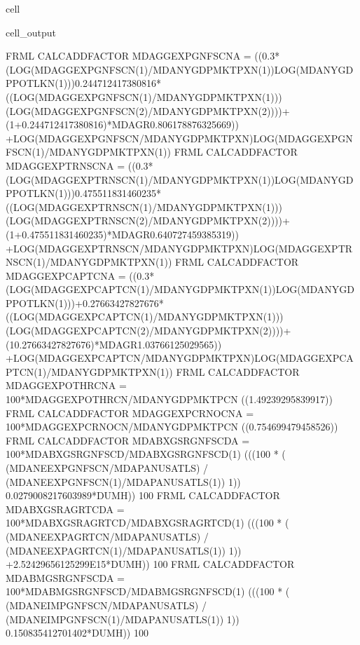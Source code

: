 \documentclass[letterpaper,10pt,english]{jupyterBook}
\begin{document}
\begin{sphinxuseclass}{cell}
\begin{sphinxVerbatimOutput}
\begin{sphinxuseclass}{cell_output}
\begin{sphinxVerbatim}[commandchars=\\\{\}]
FRML \PYGZlt{}CALC\PYGZus{}ADD\PYGZus{}FACTOR\PYGZgt{} MDAGGEXPGNFSCN\PYGZus{}A = \PYGZhy{} ((\PYGZhy{}0.3*(LOG(MDAGGEXPGNFSCN(\PYGZhy{}1)/MDANYGDPMKTPXN(\PYGZhy{}1))\PYGZhy{}LOG(MDANYGDPPOTLKN(\PYGZhy{}1)))\PYGZhy{}0.244712417380816*((LOG(MDAGGEXPGNFSCN(\PYGZhy{}1)/MDANYGDPMKTPXN(\PYGZhy{}1)))\PYGZhy{}(LOG(MDAGGEXPGNFSCN(\PYGZhy{}2)/MDANYGDPMKTPXN(\PYGZhy{}2))))+(1+0.244712417380816)*MDAGR\PYGZhy{}0.806178876325669)) +LOG(MDAGGEXPGNFSCN/MDANYGDPMKTPXN)\PYGZhy{}LOG(MDAGGEXPGNFSCN(\PYGZhy{}1)/MDANYGDPMKTPXN(\PYGZhy{}1))\PYGZdl{}
FRML \PYGZlt{}CALC\PYGZus{}ADD\PYGZus{}FACTOR\PYGZgt{} MDAGGEXPTRNSCN\PYGZus{}A = \PYGZhy{} ((\PYGZhy{}0.3*(LOG(MDAGGEXPTRNSCN(\PYGZhy{}1)/MDANYGDPMKTPXN(\PYGZhy{}1))\PYGZhy{}LOG(MDANYGDPPOTLKN(\PYGZhy{}1)))\PYGZhy{}0.475511831460235*((LOG(MDAGGEXPTRNSCN(\PYGZhy{}1)/MDANYGDPMKTPXN(\PYGZhy{}1)))\PYGZhy{}(LOG(MDAGGEXPTRNSCN(\PYGZhy{}2)/MDANYGDPMKTPXN(\PYGZhy{}2))))+(1+0.475511831460235)*MDAGR\PYGZhy{}0.640727459385319)) +LOG(MDAGGEXPTRNSCN/MDANYGDPMKTPXN)\PYGZhy{}LOG(MDAGGEXPTRNSCN(\PYGZhy{}1)/MDANYGDPMKTPXN(\PYGZhy{}1))\PYGZdl{}
FRML \PYGZlt{}CALC\PYGZus{}ADD\PYGZus{}FACTOR\PYGZgt{} MDAGGEXPCAPTCN\PYGZus{}A = \PYGZhy{} ((\PYGZhy{}0.3*(LOG(MDAGGEXPCAPTCN(\PYGZhy{}1)/MDANYGDPMKTPXN(\PYGZhy{}1))\PYGZhy{}LOG(MDANYGDPPOTLKN(\PYGZhy{}1)))+0.27663427827676*((LOG(MDAGGEXPCAPTCN(\PYGZhy{}1)/MDANYGDPMKTPXN(\PYGZhy{}1)))\PYGZhy{}(LOG(MDAGGEXPCAPTCN(\PYGZhy{}2)/MDANYGDPMKTPXN(\PYGZhy{}2))))+(1\PYGZhy{}0.27663427827676)*MDAGR\PYGZhy{}1.03766125029565)) +LOG(MDAGGEXPCAPTCN/MDANYGDPMKTPXN)\PYGZhy{}LOG(MDAGGEXPCAPTCN(\PYGZhy{}1)/MDANYGDPMKTPXN(\PYGZhy{}1))\PYGZdl{}
FRML \PYGZlt{}CALC\PYGZus{}ADD\PYGZus{}FACTOR\PYGZgt{} MDAGGEXPOTHRCN\PYGZus{}A = 100*MDAGGEXPOTHRCN/MDANYGDPMKTPCN\PYGZhy{} ((1.49239295839917)) \PYGZdl{}
FRML \PYGZlt{}CALC\PYGZus{}ADD\PYGZus{}FACTOR\PYGZgt{} MDAGGEXPCRNOCN\PYGZus{}A = 100*MDAGGEXPCRNOCN/MDANYGDPMKTPCN\PYGZhy{} ((0.754699479458526)) \PYGZdl{}
FRML \PYGZlt{}CALC\PYGZus{}ADD\PYGZus{}FACTOR\PYGZgt{} MDABXGSRGNFSCD\PYGZus{}A = 100*MDABXGSRGNFSCD/MDABXGSRGNFSCD(\PYGZhy{}1)\PYGZhy{} (((100 * ( (MDANEEXPGNFSCN/MDAPANUSATLS) / (MDANEEXPGNFSCN(\PYGZhy{}1)/MDAPANUSATLS(\PYGZhy{}1)) \PYGZhy{}1)) \PYGZhy{}0.0279008217603989*DUMH)) \PYGZhy{}100\PYGZdl{}
FRML \PYGZlt{}CALC\PYGZus{}ADD\PYGZus{}FACTOR\PYGZgt{} MDABXGSRAGRTCD\PYGZus{}A = 100*MDABXGSRAGRTCD/MDABXGSRAGRTCD(\PYGZhy{}1)\PYGZhy{} (((100 * ( (MDANEEXPAGRTCN/MDAPANUSATLS) / (MDANEEXPAGRTCN(\PYGZhy{}1)/MDAPANUSATLS(\PYGZhy{}1)) \PYGZhy{}1)) +2.52429656125299E\PYGZhy{}15*DUMH)) \PYGZhy{}100\PYGZdl{}
FRML \PYGZlt{}CALC\PYGZus{}ADD\PYGZus{}FACTOR\PYGZgt{} MDABMGSRGNFSCD\PYGZus{}A = 100*MDABMGSRGNFSCD/MDABMGSRGNFSCD(\PYGZhy{}1)\PYGZhy{} (((100 * ( (MDANEIMPGNFSCN/MDAPANUSATLS) / (MDANEIMPGNFSCN(\PYGZhy{}1)/MDAPANUSATLS(\PYGZhy{}1)) \PYGZhy{}1)) \PYGZhy{}0.150835412701402*DUMH)) \PYGZhy{}100\PYGZdl{}

\end{sphinxVerbatim}
\end{sphinxuseclass}
\end{sphinxVerbatimOutput}
\end{sphinxuseclass}
\end{document}
